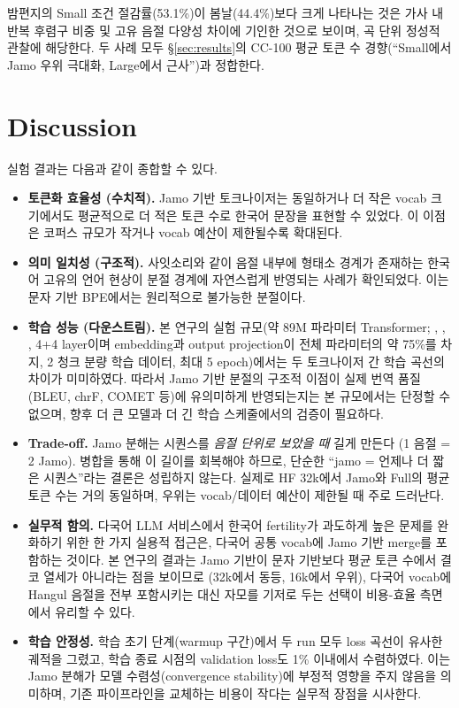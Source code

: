 \documentclass[sigconf,nonacm]{acmart}
\begin{document}
밤편지의 Small 조건 절감률(53.1\%)이 봄날(44.4\%)보다 크게 나타나는 것은 가사 내 반복
후렴구 비중 및 고유 음절 다양성 차이에 기인한 것으로 보이며, 곡 단위 정성적 관찰에 해당한다.
두 사례 모두 \S\ref{sec:results}의 CC-100 평균 토큰 수 경향(``Small에서 Jamo 우위 극대화, Large에서 근사'')과
정합한다.

\section{Discussion}
\label{sec:discussion}

실험 결과는 다음과 같이 종합할 수 있다.
\begin{itemize}
    \item \textbf{토큰화 효율성 (수치적).} Jamo 기반 토크나이저는 동일하거나 더 작은 vocab 크기에서도
    평균적으로 더 적은 토큰 수로 한국어 문장을 표현할 수 있었다. 이 이점은 코퍼스 규모가 작거나
    vocab 예산이 제한될수록 확대된다.
    \item \textbf{의미 일치성 (구조적).} 사잇소리와 같이 음절 내부에 형태소 경계가 존재하는 한국어 고유의
    언어 현상이 분절 경계에 자연스럽게 반영되는 사례가 확인되었다. 이는 문자 기반 BPE에서는
    원리적으로 불가능한 분절이다.
    \item \textbf{학습 성능 (다운스트림).} 본 연구의 실험 규모(약 89M 파라미터 Transformer;
    , , , 4+4 layer이며
    embedding과 output projection이 전체 파라미터의 약 75\%를 차지,
    2 청크 분량 학습 데이터, 최대 5 epoch)에서는 두 토크나이저 간 학습 곡선의 차이가 미미하였다.
    따라서 Jamo 기반 분절의 구조적 이점이 실제 번역 품질(BLEU, chrF, COMET 등)에 유의미하게
    반영되는지는 본 규모에서는 단정할 수 없으며, 향후 더 큰 모델과 더 긴 학습 스케줄에서의
    검증이 필요하다.
    \item \textbf{Trade-off.} Jamo 분해는 시퀀스를 \emph{음절 단위로 보았을 때} 길게 만든다
    (1 음절 = 2 Jamo). 병합을 통해 이 길이를 회복해야 하므로, 단순한 ``jamo = 언제나 더 짧은
    시퀀스''라는 결론은 성립하지 않는다. 실제로 HF 32k에서 Jamo와 Full의 평균 토큰 수는 거의
    동일하며, 우위는 vocab/데이터 예산이 제한될 때 주로 드러난다.
    \item \textbf{실무적 함의.} 다국어 LLM 서비스에서 한국어 fertility가 과도하게 높은 문제를 완화하기
    위한 한 가지 실용적 접근은, 다국어 공통 vocab에 Jamo 기반 merge를 포함하는 것이다.
    본 연구의 결과는 Jamo 기반이 문자 기반보다 평균 토큰 수에서 결코 열세가 아니라는 점을 보이므로
    (32k에서 동등, 16k에서 우위), 다국어 vocab에 Hangul 음절을 전부 포함시키는 대신 자모를 기저로 두는
    선택이 비용-효율 측면에서 유리할 수 있다.
    \item \textbf{학습 안정성.} 학습 초기 단계(warmup 구간)에서 두 run 모두 loss 곡선이 유사한 궤적을
    그렸고, 학습 종료 시점의 validation loss도 1\% 이내에서 수렴하였다. 이는 Jamo 분해가 모델
    수렴성(convergence stability)에 부정적 영향을 주지 않음을 의미하며, 기존 파이프라인을
    교체하는 비용이 작다는 실무적 장점을 시사한다.
\end{itemize}
\end{document}
